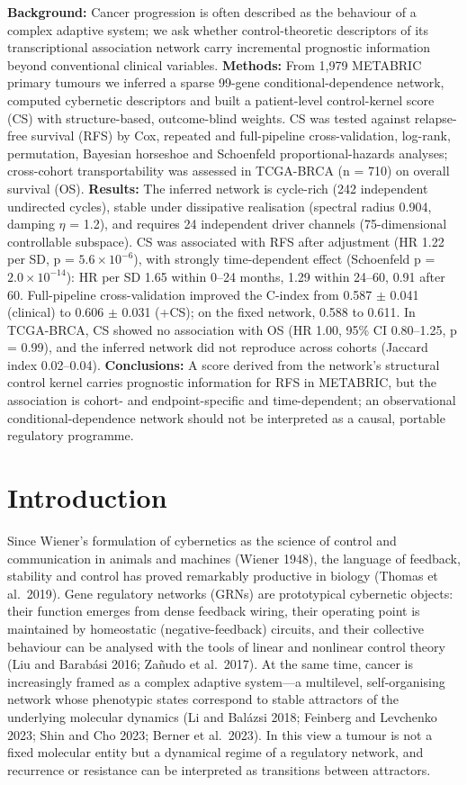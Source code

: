 \documentclass[12pt]{article}
\begin{document}
\textbf{Background:} Cancer progression is often described as the behaviour of
a complex adaptive system; we ask whether control-theoretic descriptors of
its transcriptional association network carry incremental prognostic
information beyond conventional clinical variables. \textbf{Methods:} From
1,979 METABRIC primary tumours we inferred a sparse 99-gene
conditional-dependence network, computed cybernetic descriptors and built a
patient-level control-kernel score (CS) with structure-based, outcome-blind
weights. CS was tested against relapse-free survival (RFS) by Cox, repeated
and full-pipeline cross-validation, log-rank, permutation, Bayesian
horseshoe and Schoenfeld proportional-hazards analyses; cross-cohort
transportability was assessed in TCGA-BRCA (n = 710) on overall survival
(OS). \textbf{Results:} The inferred network is cycle-rich (242 independent
undirected cycles), stable under dissipative realisation (spectral radius
0.904, damping $\eta$ = 1.2), and requires 24 independent driver channels
(75-dimensional controllable subspace). CS was associated with RFS after
adjustment (HR 1.22 per SD, p = $5.6\times10^{-6}$), with strongly
time-dependent effect (Schoenfeld p = $2.0\times10^{-14}$): HR per SD 1.65 within
0--24 months, 1.29 within 24--60, 0.91 after 60. Full-pipeline
cross-validation improved the C-index from 0.587 $\pm$ 0.041 (clinical) to
0.606 $\pm$ 0.031 (+CS); on the fixed network, 0.588 to 0.611. In
TCGA-BRCA, CS showed no association with OS (HR 1.00, 95\% CI 0.80--1.25,
p = 0.99), and the inferred network did not reproduce across cohorts
(Jaccard index 0.02--0.04). \textbf{Conclusions:} A score derived from the network's
structural control kernel carries prognostic information for RFS in
METABRIC, but the association is cohort- and endpoint-specific and
time-dependent; an observational conditional-dependence network should not
be interpreted as a causal, portable regulatory programme.

\section{Introduction}

Since Wiener's formulation of cybernetics as the science of control and
communication in animals and machines (Wiener 1948), the language of
feedback, stability and control has proved remarkably productive in biology
(Thomas et al.\ 2019). Gene regulatory networks (GRNs) are prototypical
cybernetic objects: their function emerges from dense feedback wiring, their
operating point is maintained by homeostatic (negative-feedback) circuits,
and their collective behaviour can be analysed with the tools of linear and
nonlinear control theory (Liu and Barab\'asi 2016; Za\~nudo et al.\ 2017).
At the same time, cancer is increasingly framed as a complex adaptive
system---a multilevel, self-organising network whose phenotypic states
correspond to stable attractors of the underlying molecular dynamics (Li and
Bal\'azsi 2018; Feinberg and Levchenko 2023; Shin and Cho 2023; Berner et
al.\ 2023). In this view a tumour is not a fixed molecular entity but a
dynamical regime of a regulatory network, and recurrence or resistance can
be interpreted as transitions between attractors.
\end{document}

